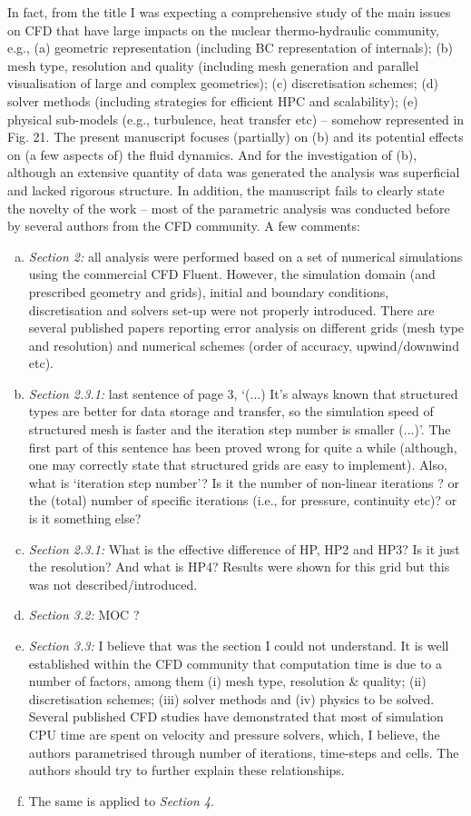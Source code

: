 \documentclass[14pt,twoside]{report}
\begin{document}
In fact, from the title I was expecting a comprehensive study of the main issues on CFD that have large impacts on the nuclear thermo-hydraulic community, e.g., (a) geometric representation (including BC representation of internals); (b) mesh type, resolution and quality (including mesh generation and parallel visualisation of large and complex geometries); (c) discretisation schemes; (d) solver methods (including strategies for efficient HPC and scalability); (e) physical sub-models (e.g., turbulence, heat transfer etc) -- somehow represented in Fig. 21. The present manuscript focuses (partially) on (b) and its potential effects on (a few aspects of) the fluid dynamics. And for the investigation of (b), although an extensive quantity of data was generated the analysis was superficial and lacked rigorous structure. In addition, the manuscript fails to clearly state the novelty of the work -- most of the parametric analysis was conducted before by several authors from the CFD community. A few comments:
\begin{enumerate}[(a)] 
%
    \item {\it Section 2:} all analysis were performed based on a set of numerical simulations using the commercial CFD Fluent. However, the simulation domain (and prescribed geometry and grids), initial and boundary conditions, discretisation and solvers set-up were not properly introduced. There are several published papers reporting error analysis on different grids (mesh type and resolution) and numerical schemes (order of accuracy, upwind/downwind etc).
    \item {\it Section 2.3.1:} last sentence of page 3, `(...) It's always known that structured types are better for data storage and transfer, so the simulation speed of structured mesh is faster and the iteration step number is smaller (...)'. The first part of this sentence has been proved wrong for quite a while (although, one may correctly state that structured grids are easy to implement). Also, what is `iteration step number'? Is it the number of non-linear iterations ? or the (total) number of specific iterations (i.e., for pressure, continuity etc)? or is it something else? 
    \item {\it Section 2.3.1:} What is the effective difference of HP, HP2 and HP3? Is it just the resolution? And what is HP4? Results were shown for this grid but this was not described/introduced.
    \item {\it Section 3.2:} MOC ? 
    \item {\it Section 3.3:} I believe that was the section I could not understand. It is well established within the CFD community that computation time is due to a number of factors, among them (i) mesh type, resolution $\&$ quality; (ii) discretisation schemes; (iii) solver methods and (iv) physics to be solved. Several published CFD studies have demonstrated that most of simulation CPU time are spent on velocity and pressure solvers, which, I believe, the authors parametrised through number of iterations, time-steps and cells. The authors should try to further explain these relationships.
    \item The same is applied to {\it Section 4}.%
\end{enumerate}
\end{document}
